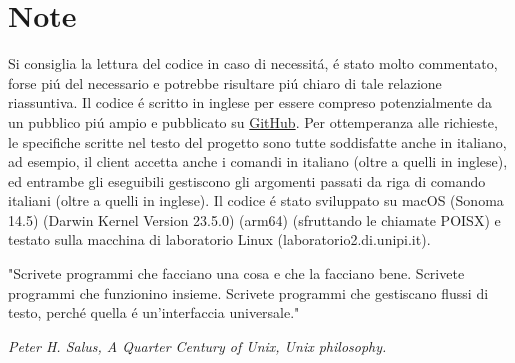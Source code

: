 \chapter*{Note}

Si consiglia la lettura del codice in caso di necessit\'a, \'e stato molto commentato, forse pi\'u del necessario e potrebbe risultare pi\'u chiaro di tale relazione riassuntiva. Il codice \'e scritto in inglese per essere compreso potenzialmente da un pubblico pi\'u ampio e pubblicato su {\color{cyan}\href{https://github.com/JuliusNixi/Boggle}{GitHub}}. Per ottemperanza alle richieste, le specifiche scritte nel testo del progetto sono tutte soddisfatte anche in italiano, ad esempio, il client accetta anche i comandi in italiano (oltre a quelli in inglese), ed entrambe gli eseguibili gestiscono gli argomenti passati da riga di comando italiani (oltre a quelli in inglese). Il codice \'e stato sviluppato su macOS (Sonoma 14.5) (Darwin Kernel Version 23.5.0) (arm64) (sfruttando le chiamate POISX) e testato sulla macchina di laboratorio Linux (laboratorio2.di.unipi.it).

\vspace{5mm}

\epigraph{"Scrivete programmi che facciano una cosa e che la facciano bene. Scrivete programmi che funzionino insieme. Scrivete programmi che gestiscano flussi di testo, perch\'e quella \'e un'interfaccia universale."}{\textit{Peter H. Salus, A Quarter Century of Unix, Unix philosophy. }}

